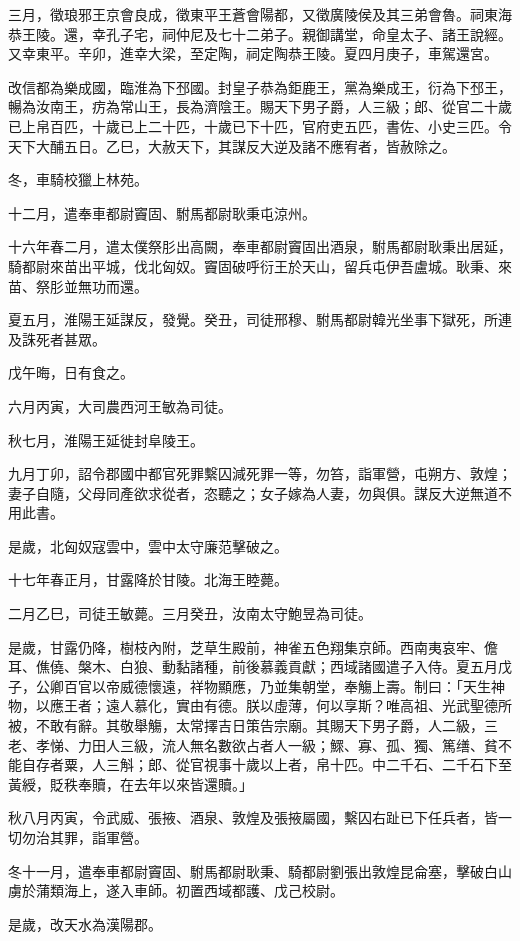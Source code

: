 \begin{pinyinscope}
三月，徵琅邪王京會良成，徵東平王蒼會陽都，又徵廣陵侯及其三弟會魯。祠東海恭王陵。還，幸孔子宅，祠仲尼及七十二弟子。親御講堂，命皇太子、諸王說經。又幸東平。辛卯，進幸大梁，至定陶，祠定陶恭王陵。夏四月庚子，車駕還宮。

改信都為樂成國，臨淮為下邳國。封皇子恭為鉅鹿王，黨為樂成王，衍為下邳王，暢為汝南王，疠為常山王，長為濟陰王。賜天下男子爵，人三級；郎、從官二十歲已上帛百匹，十歲已上二十匹，十歲已下十匹，官府吏五匹，書佐、小史三匹。令天下大酺五日。乙巳，大赦天下，其謀反大逆及諸不應宥者，皆赦除之。

冬，車騎校獵上林苑。

十二月，遣奉車都尉竇固、駙馬都尉耿秉屯涼州。

十六年春二月，遣太僕祭肜出高闕，奉車都尉竇固出酒泉，駙馬都尉耿秉出居延，騎都尉來苗出平城，伐北匈奴。竇固破呼衍王於天山，留兵屯伊吾盧城。耿秉、來苗、祭肜並無功而還。

夏五月，淮陽王延謀反，發覺。癸丑，司徒邢穆、駙馬都尉韓光坐事下獄死，所連及誅死者甚眾。

戊午晦，日有食之。

六月丙寅，大司農西河王敏為司徒。

秋七月，淮陽王延徙封阜陵王。

九月丁卯，詔令郡國中都官死罪繫囚減死罪一等，勿笞，詣軍營，屯朔方、敦煌；妻子自隨，父母同產欲求從者，恣聽之；女子嫁為人妻，勿與俱。謀反大逆無道不用此書。

是歲，北匈奴寇雲中，雲中太守廉范擊破之。

十七年春正月，甘露降於甘陵。北海王睦薨。

二月乙巳，司徒王敏薨。三月癸丑，汝南太守鮑昱為司徒。

是歲，甘露仍降，樹枝內附，芝草生殿前，神雀五色翔集京師。西南夷哀牢、儋耳、僬僥、槃木、白狼、動黏諸種，前後慕義貢獻；西域諸國遣子入侍。夏五月戊子，公卿百官以帝威德懷遠，祥物顯應，乃並集朝堂，奉觴上壽。制曰：「天生神物，以應王者；遠人慕化，實由有德。朕以虛薄，何以享斯？唯高祖、光武聖德所被，不敢有辭。其敬舉觴，太常擇吉日策告宗廟。其賜天下男子爵，人二級，三老、孝悌、力田人三級，流人無名數欲占者人一級；鰥、寡、孤、獨、篤缮、貧不能自存者粟，人三斛；郎、從官視事十歲以上者，帛十匹。中二千石、二千石下至黃綬，貶秩奉贖，在去年以來皆還贖。」

秋八月丙寅，令武威、張掖、酒泉、敦煌及張掖屬國，繫囚右趾已下任兵者，皆一切勿治其罪，詣軍營。

冬十一月，遣奉車都尉竇固、駙馬都尉耿秉、騎都尉劉張出敦煌昆侖塞，擊破白山虜於蒲類海上，遂入車師。初置西域都護、戊己校尉。

是歲，改天水為漢陽郡。


\end{pinyinscope}
